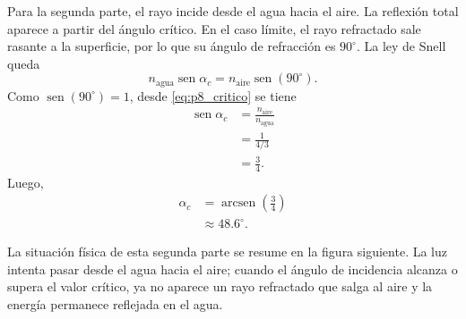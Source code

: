 \documentclass[11pt]{article}
\newcommand{\sen}{\operatorname{sen}}
\newcommand{\arcsen}{\operatorname{arcsen}}
\begin{document}
Para la segunda parte, el rayo incide desde el agua hacia el aire. La reflexi\'on total aparece a partir del \'angulo cr\'itico. En el caso l\'imite, el rayo refractado sale rasante a la superficie, por lo que su \'angulo de refracci\'on es $90^\circ$. La ley de Snell queda
\begin{equation}
    n_{\text{agua}}\sen\alpha_c=n_{\text{aire}}\sen(90^\circ).
    \label{eq:p8_critico}
\end{equation}
Como $\sen(90^\circ)=1$, desde \eqref{eq:p8_critico} se tiene
\begin{align*}
    \sen\alpha_c
    &=\frac{n_{\text{aire}}}{n_{\text{agua}}}\\
    &=\frac{1}{4/3}\\
    &=\frac{3}{4}.
\end{align*}
Luego,
\begin{align*}
    \alpha_c&=\arcsen\!\left(\frac{3}{4}\right)\\
             &\approx48.6^\circ.
\end{align*}

La situaci\'on f\'isica de esta segunda parte se resume en la figura siguiente. La luz intenta pasar desde el agua hacia el aire; cuando el \'angulo de incidencia alcanza o supera el valor cr\'itico, ya no aparece un rayo refractado que salga al aire y la energ\'ia permanece reflejada en el agua.
\end{document}
